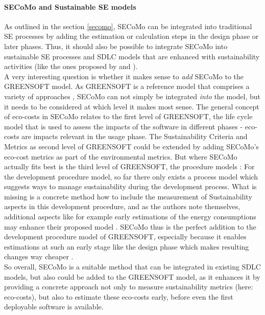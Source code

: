 \documentclass[oribibl]{llncs}
\begin{document}
\paragraph{SECoMo and Sustainable SE models}
As outlined in the section \ref{secomo}, SECoMo can be integrated into traditional SE processes by adding the estimation or calculation steps in the design phase or later phases. Thus, it should also be possible to integrate SECoMo into sustainable SE processes and SDLC models that are enhanced with sustainability activities (like the ones proposed by \cite{agarwal_sustainable_2012} and \cite{shenoy_green_2011}).\\
A very interesting question is whether it makes sense to \textit{add} SECoMo to the GREENSOFT model. %
As GREENSOFT is a reference model that comprises a variety of approaches \cite{naumann_greensoft_2011}, SECoMo can not simply be integrated \textit{into} the model, but it needs to be considered at which level it makes most sense. The general concept of eco-costs in SECoMo relates to the first level of GREENSOFT, the life cycle model that is used to assess the impacts of the software in different phases \cite{naumann_greensoft_2011} - eco-costs are impacts relevant in the usage phase. The Sustainability Criteria and Metrics as second level of GREENSOFT could be extended by adding SECoMo's eco-cost metrics as part of the environmental metrics. But where SECoMo actually fits best is the third level of GREENSOFT, the procedure models \cite{naumann_greensoft_2011}: For the development procedure model, so far there only exists a process model which suggests ways to manage sustainability during the development process. What is missing is a concrete method how to include the measurement of Sustainability aspects in this development procedure, and as the authors note themselves, additional aspects like for example early estimations of the energy consumptions may enhance their proposed model \cite{naumann_greensoft_2011}. %
SECoMo thus is the perfect addition to the development procedure model of GREENSOFT, especially because it enables estimations at such an early stage like the design phase which makes resulting changes way cheaper \cite{schulze_cost_2016}.\\
So overall, SECoMo is a suitable method that can be integrated in existing SDLC models, but also could be added to the GREENSOFT model, as it enhances it by providing a concrete approach not only to measure sustainability metrics (here: eco-costs), but also to estimate these eco-costs early, before even the first deployable software is available.
\end{document}
